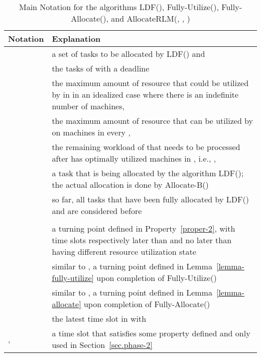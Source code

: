\documentclass[10pt,journal,compsoc]{IEEEtran}
\begin{document}
\begin{table}
\centering
\begin{threeparttable}[!ht]

\caption{Main Notation for the algorithms LDF(), Fully-Utilize(), Fully-Allocate(), and AllocateRLM(, , )}

\begin{tabular}{|C{1.2cm}|C{6.2cm}|}
\hline
   Notation & Explanation\\
\hline

 & a set of tasks to be allocated by LDF() and  \\ \hline

 & the tasks of  with a deadline   \\ \hline

 & the maximum amount of resource that could be utilized by  in  in an idealized case where there is an indefinite number of machines,    \\ \hline

  & the maximum amount of resource that can be utilized by  on  machines in every ,   \\ \hline

  &  the remaining workload of  that needs to be processed after  has optimally utilized  machines in , i.e., ,   \\ \hline

 & a task that is being allocated by the algorithm LDF(); the actual allocation is done by Allocate-B() \\ \hline

 & so far, all tasks that have been fully allocated by LDF() and are considered before   \\ \hline

 &   \\ \hline

 & a turning point defined in Property~\ref{proper-2}, with time slots respectively later than and no later than  having different resource utilization state  \\ \hline

 & similar to , a turning point defined in Lemma~\ref{lemma-fully-utilize} upon completion of Fully-Utilize()  \\ \hline

 & similar to , a turning point defined in Lemma~\ref{lemma-allocate} upon completion of Fully-Allocate()  \\ \hline

 & the latest time slot in  with   \\ \hline


,  & a time slot that satisfies some property defined and only used in Section~\ref{sec.phase-2}  \\ \hline

\end{tabular}
\label{table-2}
 \end{threeparttable}
\end{table}
\end{document}
